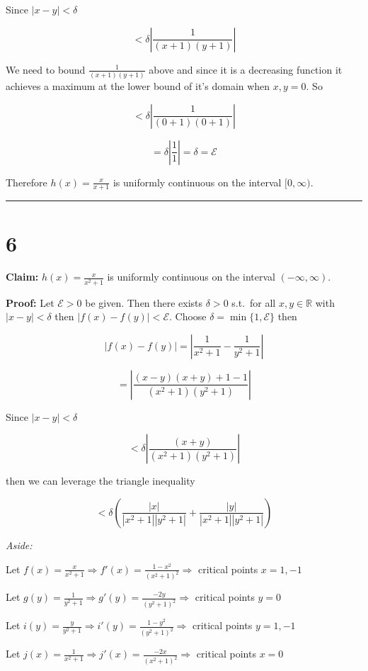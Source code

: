 \documentclass[10pt,letterpaper]{article}
\newcommand\R{\mathds{R}}
\newcommand\E{\mathcal{E}}
\newcommand\ds{\displaystyle}
\newcommand\qedsym{\hfill \rule{2mm}{2mm}}
\begin{document}
Since $|x-y|<\delta$

\[< \delta\left|\frac{1}{(x+1)(y+1)}\right|\]

We need to bound $\frac{1}{(x+1)(y+1)}$ above and since it is a decreasing function it achieves a maximum at the lower bound of it's domain when $x,y=0$. So

\[<\delta\left|\frac{1}{(0+1)(0+1)}\right|\]

\[=\delta\left|\frac{1}{1}\right| = \delta = \E\]

Therefore $h(x) = \frac{x}{x+1}$ is uniformly continuous on the interval $[0, \infty)$.

\qedsym

\section*{6}

\textbf{Claim:} $h(x) = \frac{x}{x^2+1}$ is uniformly continuous on the interval $(-\infty, \infty)$.

\medskip

\textbf{Proof:} Let $\E > 0$ be given. Then there exists $\delta > 0$ s.t.\ for all $x,y\in\R$ with $|x-y|<\delta$ then $|f(x)-f(y)| < \E$. Choose $\delta = \min\{1, \E\}$ then

\[|f(x) - f(y)| = \left|\frac{1}{x^2+1}-\frac{1}{y^2 + 1}\right|\]

\[= \left|\frac{(x-y)(x+y)+1-1}{(x^2+1)(y^2+1)}\right|\]

Since $|x-y|<\delta$

\[< \delta\left|\frac{(x+y)}{(x^2+1)(y^2+1)}\right|\]

then we can leverage the triangle inequality

\[< \delta\left(\frac{|x|}{|x^2+1||y^2+1|}+\frac{|y|}{|x^2+1||y^2+1|}\right)\]

{\addtolength{\leftskip}{5mm}
\textit{Aside:}

Let $\ds f(x) = \frac{x}{x^2+1} \Rightarrow f'(x) = \frac{1-x^2}{{(x^2+1)}^2}\Rightarrow$ critical points $x=1,-1$

Let $\ds g(y) = \frac{1}{y^2+1} \Rightarrow g'(y) = \frac{-2y}{{(y^2+1)}^2}\Rightarrow$ critical points $y=0$

Let $\ds i(y) = \frac{y}{y^2+1} \Rightarrow i'(y) = \frac{1-y^2}{{(y^2+1)}^2}\Rightarrow$ critical points $y=1,-1$

Let $\ds j(x) = \frac{1}{x^2+1} \Rightarrow j'(x) = \frac{-2x}{{(x^2+1)}^2}\Rightarrow$ critical points $x=0$

}\medskip
\end{document}
